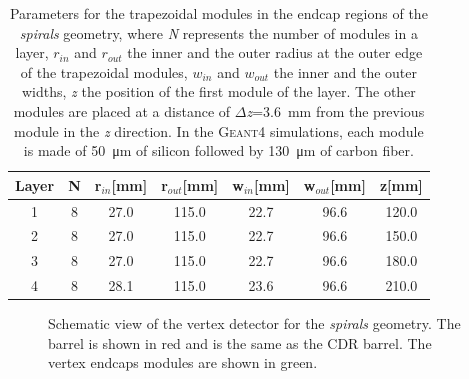 \begin{table}[H]
  \caption{Parameters for the trapezoidal modules in the endcap regions
    of the {\it spirals} geometry, where \textit{N} represents the
    number of modules in a layer, $r_{in}$ and $r_{out}$ the inner and
    the outer radius at the outer edge of the trapezoidal modules,
    $w_{in}$ and $w_{out}$ the inner and the outer widths, \textit{z}
    the position of the first module of the layer. The other modules are placed at a distance of $\Delta$\textit{z}=3.6~mm from the previous module in the \textit{z} direction. In the \textsc{Geant4} simulations, each module is made of \SI{50}{\micro\meter} of silicon followed by \SI{130}{\micro\meter} of carbon fiber.}
  \begin{center}
    \begin{tabular}{ c c c c c c c }
      \hline
      Layer & N & r$_{in}$[mm] & r$_{out}$[mm] & w$_{in}$[mm] & w$_{out}$[mm] & z[mm] \\ \hline \hline
      1 & 8 & 27.0 & 115.0 & 22.7 & 96.6 & 120.0 \\ \hline
      2 & 8 & 27.0 & 115.0 & 22.7 & 96.6 & 150.0 \\ \hline
      3 & 8 & 27.0 & 115.0 & 22.7 & 96.6 & 180.0 \\ \hline
      4 & 8 & 28.1 & 115.0 & 23.6 & 96.6 & 210.0\\ \hline
    \end{tabular}
  \end{center}
  \label{tab:params_spiral_endcap}
\end{table}

\begin{figure}[H]
  \centering
  \caption{Schematic view of the vertex detector for the {\it spirals} geometry. The barrel is shown in red and is the same as the CDR barrel. The vertex endcaps modules are shown in green.}
  \label{fig:singleSpiralGeom}
\end{figure}

